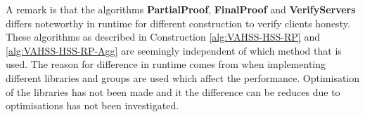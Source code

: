 A remark is that the algorithms \textbf{PartialProof}, \textbf{FinalProof} and \textbf{VerifyServers} differs noteworthy in runtime for different construction to verify clients honesty. These algorithms as described in Construction \ref{alg:VAHSS-HSS-RP} and \ref{alg:VAHSS-HSS-RP-Agg} are seemingly independent of which method that is used. The reason for difference in runtime comes from when implementing different libraries and groups are used which affect the performance. Optimisation of the libraries has not been made and it the difference can be reduces due to optimisations has not been investigated.
 



